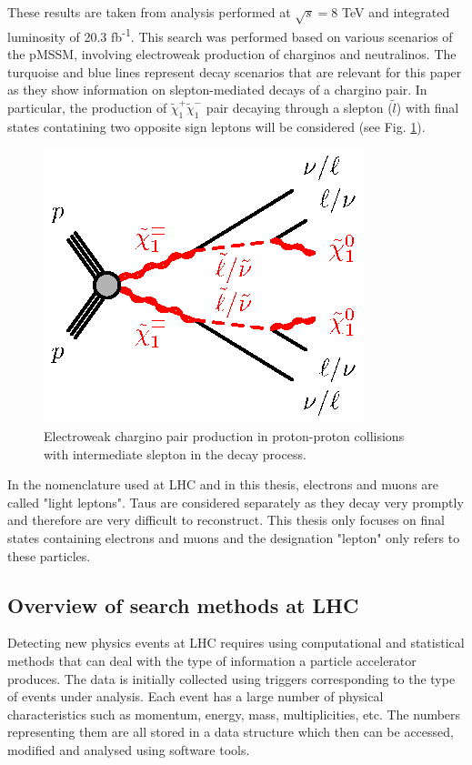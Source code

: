These results are taken from \citep{atlas2015search} analysis performed at $\sqrt{s}=$8 TeV and integrated luminosity of 20.3 fb\textsuperscript{-1}. This search was performed based on various scenarios of the pMSSM, involving electroweak production of charginos and neutralinos. The turquoise and blue lines represent decay scenarios that are relevant for this paper as they show information on slepton-mediated decays of a chargino pair. 
In particular, the production of $\tilde{\chi}^{+}_{1}\tilde{\chi}^{-}_{1}$ pair decaying through a slepton ($\tilde{l}$) with final states contatining two opposite sign leptons will be considered (see Fig. \ref{fig:EWchargino}). 
\begin{figure}[!h]
  \centering   	
  	\captionsetup{width=0.8\textwidth}
	\includegraphics[]{Chap2/C1C1-llvvN1N1-slsnu}	
\caption[Optional caption for list of figures]{Electroweak chargino pair production in proton-proton collisions with intermediate slepton in the decay process.}\label{fig:EWchargino}
\end{figure}  

In the nomenclature used at LHC and in this thesis, electrons and muons are called "light leptons". Taus are considered separately as they decay very promptly and therefore are very difficult to reconstruct. This thesis only focuses on final states containing electrons and muons and the designation "lepton" only refers to these particles.  



\subsection{Overview of search methods at LHC}
Detecting new physics events at LHC requires using computational and statistical methods that can deal with the type of information a particle accelerator produces. The data is initially collected using triggers corresponding to the type of events under analysis. Each event has a large number of physical characteristics such as momentum, energy, mass, multiplicities, etc. The numbers representing them are all stored in a data structure which then can be accessed, modified and analysed using software tools. 

